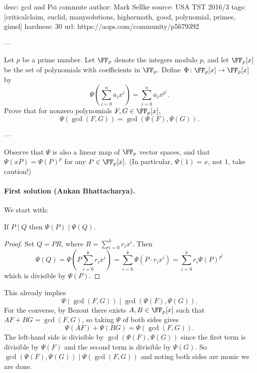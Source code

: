 desc:  gcd and Psi commute
author: Mark Sellke
source:  USA TST 2016/3
tags:  [criticalclaim, euclid, manysolutions, highermath, good, polynomial, primes, gimel]
hardness: 30
url: https://aops.com/community/p5679392

---

Let $p$ be a prime number. Let $\FF_p$ denote the integers modulo $p$,
and let $\FF_p[x]$ be the set of polynomials with coefficients in $\FF_p$.
Define $\Psi \colon \FF_p[x] \to \FF_p[x]$ by
\[ \Psi\left( \sum_{i=0}^n a_i x^i \right) = \sum_{i=0}^n a_i x^{p^i}. \]
Prove that for nonzero polynomials $F,G \in \FF_p[x]$,
\[ \Psi(\gcd(F,G)) = \gcd(\Psi(F), \Psi(G)). \]

---


Observe that $\Psi$ is also a linear map of $\FF_p$ vector spaces,
and that $\Psi(xP) = \Psi(P)^p$ for any $P \in \FF_p[x]$.
(In particular, $\Psi(1) = x$, not $1$, take caution!)

\paragraph{First solution (Ankan Bhattacharya).}
We start with:
\begin{claim*}
  If $P \mid Q$ then $\Psi(P) \mid \Psi(Q)$.
\end{claim*}
\begin{proof}
  Set $Q = PR$, where $R = \sum_{i=0}^k r_i x^i$.
  Then
  \[ \Psi(Q) = \Psi\left( P\sum_{i=0}^k r_i x^i \right)
    = \sum_{i=0}^k \Psi\left( P \cdot r_i x^i  \right)
    = \sum_{i=0}^k r_i \Psi(P)^{p^i} \]
  which is divisible by $\Psi(P)$.
\end{proof}

This already implies
\[ \Psi(\gcd(F,G)) \mid \gcd(\Psi(F), \Psi(G)). \]
For the converse, by Bezout there exists $A,B \in \FF_p[x]$
such that $AF + BG = \gcd(F,G)$, so taking $\Psi$ of both sides gives
\[ \Psi(AF) + \Psi(BG) = \Psi\left( \gcd(F,G) \right). \]
The left-hand side is divisible by $\gcd(\Psi(F), \Psi(G))$
since the first term is divisible by $\Psi(F)$
and the second term is divisible by $\Psi(G)$.
So $\gcd(\Psi(F), \Psi(G)) \mid \Psi(\gcd(F,G))$
and noting both sides are monic we are done.

